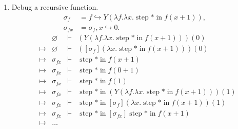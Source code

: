 \documentclass{article}
\newcommand{\hooksto}{\mathrel{\mathop{\hookrightarrow}}}
\newcommand{\entails}{\mathrel{\mathop{\vdash}}}
\DeclareMathOperator{\fstep}{step}
\newcommand{\fin}{\mathrel{\mathop{\text{in}}}}
\begin{document}
\begin{enumerate}
  \item Debug a recursive function.
    \begin{align*}
      \sigma_f &= f \hooksto Y (\lambda f . \lambda x . \fstep \ast \fin
      f(x + 1)),\\
      \sigma_{fx} &= \sigma_f, x \hooksto 0.
    \end{align*}
    \[
      \begin{array}{lcrcl}
        & & \varnothing &\entails& (Y (\lambda f . \lambda x . \fstep \ast \fin f(x + 1))) (0) \\
        &\mapsto& \varnothing &\entails& ([\sigma_f] (\lambda x . \fstep \ast \fin f(x + 1))) (0) \\
        &\mapsto& \sigma_{fx} &\entails& \fstep \ast \fin f(x + 1) \\
        &\mapsto& \sigma_{fx} &\entails& \fstep \ast \fin f(0 + 1) \\
        &\mapsto& \sigma_{fx} &\entails& \fstep \ast \fin f(1)\\
        &\mapsto& \sigma_{fx} &\entails&
        \fstep \ast \fin (Y (\lambda f . \lambda x . \fstep \ast \fin f(x + 1))) (1) \\
        &\mapsto& \sigma_{fx} &\entails&
        \fstep \ast \fin [\sigma_f] (\lambda x . \fstep \ast \fin f(x + 1)) (1) \\
        &\mapsto& \sigma_{fx} &\entails&
        \fstep \ast \fin [\sigma_{fx}] \fstep \ast \fin f(x + 1) \\
        &\mapsto& \ldots
      \end{array}
    \]
\end{enumerate}
\end{document}
